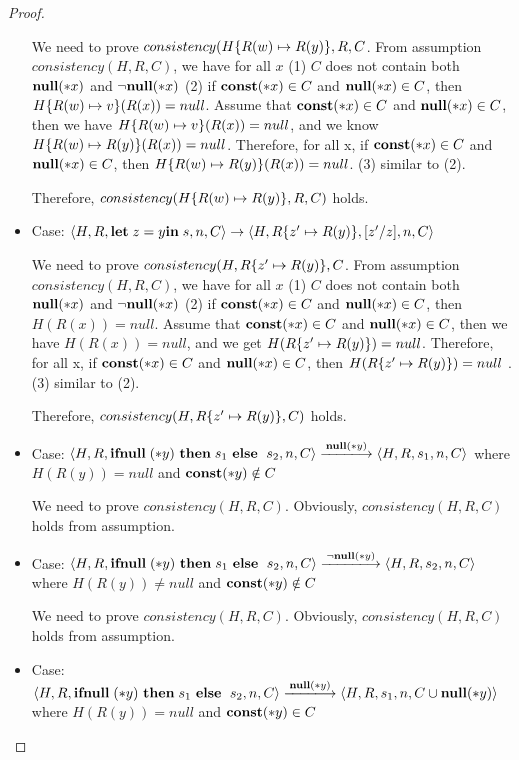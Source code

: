 \begin{proof}
\begin{itemize}
    We need to prove \(consistency(H\{R(w) \mapsto R(y)\}, R, C \). From assumption \(consistency(H, R, C)\), we have
    for all \(x\) (1) \(C\) does not contain both \({\bf null}(*x)\) and
    \(\neg{\bf null}(*x)\) (2) if \(\mathbf{const}(*x) \in C\) and \({\bf null}(*x) \in C\), then
    \(H\{R(w) \mapsto v\}(R(x)) = null\). Assume that \(\mathbf{const}(*x)
    \in C\) and \({\bf null}(*x) \in C\), then we have \(H\{R(w) \mapsto
      v\}(R(x)) = null\), and we know \(H\{R(w) \mapsto R(y)\}(R(x))
    = null\). Therefore, for all x, if \(\mathbf{const}(*x) \in C \) and
    \({\bf null}(*x) \in C \), then \(H\{R(w) \mapsto R(y)\}(R(x)) =
    null\). (3) similar to (2).
                 
    Therefore, \(consistency(H\{R(w) \mapsto R(y)\}, R, C)\) holds.


\item Case: \(\langle H, R, \mathbf{let}\; z = y \mathbf{in}\; s, n, C
  \rangle \rightarrow \langle H, R\{z' \mapsto R(y)\}, [z'/z], n, C
  \rangle \)
  
  We need to prove \(consistency(H, R\{z' \mapsto R(y)\}, C \). From
  assumption \(consistency(H, R, C)\), we have for all \(x\) (1) \(C\)
  does not contain both \({\bf null}(*x)\) and \(\neg{\bf null}(*x)\) (2) if \(\mathbf{const}(*x)
  \in C\) and \({\bf null}(*x) \in C\), then \(H(R(x)) = null\). Assume that
  \(\mathbf{const}(*x) \in C\) and \({\bf null}(*x) \in C\), then we have \(H(R(x)) =
  null\), and we get \(H(R\{z' \mapsto R(y)\}) = null\). Therefore,
  for all x, if \(\mathbf{const}(*x) \in C \) and \({\bf null}(*x) \in C \), then
  \(H(R\{z' \mapsto R(y)\}) = null\) . (3) similar to (2).
                 
    Therefore, \(consistency(H, R\{z' \mapsto R(y)\}, C)\) holds.


\item Case: \(\langle H, R, \IFNULL(*y) \ \THEN s_1\ \ELSE\ s_2, n, C
  \rangle \xlongrightarrow{\NULL(*y)} \langle H, R, s_1, n, C \rangle \)
  where \( H(R(y)) = null \) and \(\mathbf{const}(*y) \notin C\)

  We need to prove \(consistency(H, R, C) \). Obviously,
  \(consistency(H, R, C) \) holds from assumption.

\item Case: \(\langle H, R, \IFNULL(*y) \ \THEN s_1\ \ELSE\ s_2, n, C
  \rangle \xlongrightarrow{\neg\NULL(*y)} \langle H, R, s_2, n, C \rangle \)
  where \( H(R(y)) \ne null \) and \(\mathbf{const}(*y) \notin C\)

  We need to prove \(consistency(H, R, C) \). Obviously,
  \(consistency(H, R, C) \) holds from assumption.


\item Case: \(\langle H, R, \IFNULL(*y) \ \THEN s_1\ \ELSE\ s_2, n, C
  \rangle \xlongrightarrow{\NULL(*y)} \langle H, R, s_1, n, C \cup{\NULL(*y)}
  \rangle \) where \( H(R(y)) =  null \) and \(\mathbf{const}(*y) \in C\)
  

\end{itemize}
\end{proof}
